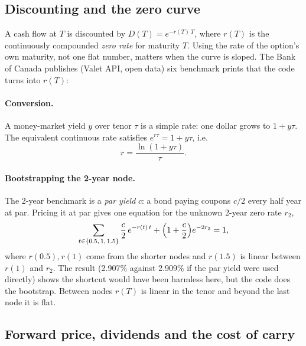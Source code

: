 \documentclass[11pt]{article}
\begin{document}
\subsection{Discounting and the zero curve}

A cash flow at $T$ is discounted by $D(T)=e^{-r(T)\,T}$, where $r(T)$ is the
continuously compounded \emph{zero rate} for maturity $T$. Using the rate of the
option's own maturity, not one flat number, matters when the curve is sloped.
The Bank of Canada publishes (Valet API, open data) six benchmark prints that the
code turns into $r(T)$:

\begin{center}

\end{center}

\paragraph{Conversion.} A money-market yield $y$ over tenor $\tau$ is a simple
rate: one dollar grows to $1+y\tau$. The equivalent continuous rate satisfies
$e^{r\tau}=1+y\tau$, i.e.
\begin{equation}
  r=\frac{\ln(1+y\tau)}{\tau}.
\end{equation}

\paragraph{Bootstrapping the 2-year node.} The 2-year benchmark is a
\emph{par yield} $c$: a bond paying coupons $c/2$ every half year at par.
Pricing it at par gives one equation for the unknown 2-year zero rate $r_2$,
\begin{equation}
  \sum_{t\in\{0.5,\,1,\,1.5\}}\frac c2\,e^{-r(t)\,t}+\Bigl(1+\frac c2\Bigr)e^{-2r_2}=1,
\end{equation}
where $r(0.5),r(1)$ come from the shorter nodes and $r(1.5)$ is linear between
$r(1)$ and $r_2$. The result (2.907\% against 2.909\% if the par yield were used
directly) shows the shortcut would have been harmless here, but the code does
the bootstrap. Between nodes $r(T)$ is linear in the tenor and beyond the
last node it is flat.

\subsection{Forward price, dividends and the cost of carry}
\end{document}
